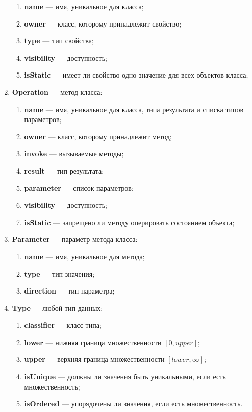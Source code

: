 \begin{enumerate}
\begin{enumerate}
    \item \textbf{name} --- имя, уникальное для класса;
    \item \textbf{owner} --- класс, которому принадлежит свойство;
    \item \textbf{type} --- тип свойства;
    \item \textbf{visibility} --- доступность;
    \item \textbf{isStatic} --- имеет ли свойство одно значение для всех объектов класса;
    \end{enumerate}
\item \textbf{Operation} --- метод класса:
    \begin{enumerate}
    \item \textbf{name} --- имя, уникальное для класса, типа результата и списка типов параметров;
    \item \textbf{owner} --- класс, которому принадлежит метод;
    \item \textbf{invoke} --- вызываемые методы;
    \item \textbf{result} --- тип результата;
    \item \textbf{parameter} --- список параметров;
    \item \textbf{visibility} --- доступность;
    \item \textbf{isStatic} --- запрещено ли методу оперировать состоянием объекта;
    \end{enumerate}
\item \textbf{Parameter} --- параметр метода класса:
    \begin{enumerate}
    \item \textbf{name} --- имя, уникальное для метода;
    \item \textbf{type} --- тип значения;
    \item \textbf{direction} --- тип параметра;
    \end{enumerate}
\item \textbf{Type} --- любой тип данных:
    \begin{enumerate}
    \item \textbf{classifier} --- класс типа;
    \item \textbf{lower} --- нижняя граница множественности $\left [ 0, upper \right ]$;
    \item \textbf{upper} --- верхняя граница множественности $\left [ lower, \infty \right ]$;
    \item \textbf{isUnique} --- должны ли значения быть уникальными, если есть множественность;
    \item \textbf{isOrdered} --- упорядочены ли значения, если есть множественность.
    \end{enumerate}
\end{enumerate}

